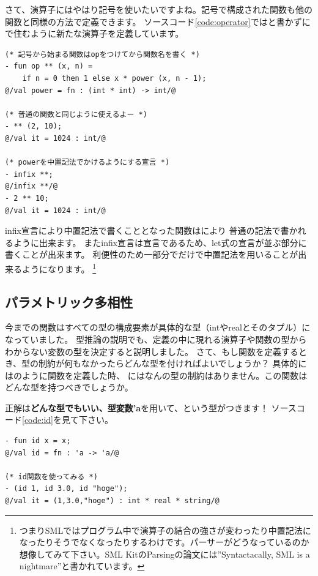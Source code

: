 \documentclass[11pt,a4paper]{article}
\begin{document}
さて、演算子にはやはり記号を使いたいですよね。記号で構成された関数も他の関数と同様の方法で定義できます。
ソースコード\ref{code:operator}ではと書かずに
\prog{**}で住むように新たな演算子を定義しています。

\begin{lstlisting}[caption=演算子の定義,label=code:operator]
(* 記号から始まる関数はopをつけてから関数名を書く *)
- fun op ** (x, n) =
    if n = 0 then 1 else x * power (x, n - 1);
@/val power = fn : (int * int) -> int/@

(* 普通の関数と同じように使えるよー *)
- ** (2, 10);
@/val it = 1024 : int/@

(* powerを中置記法でかけるようにする宣言 *)
- infix **;
@/infix **/@
- 2 ** 10;
@/val it = 1024 : int/@
\end{lstlisting}

infix宣言により中置記法で書くこととなった関数はにより
普通の記法で書かれるように出来ます。
またinfix宣言は宣言であるため、let式の宣言が並ぶ部分に書くことが出来ます。
利便性のため一部分でだけで中置記法を用いることが出来るようになります。
\footnote{つまりSMLではプログラム中で演算子の結合の強さが変わったり中置記法になったりそうでなくなったりするわけです。パーサーがどうなっているのか想像してみて下さい。SML KitのParsingの論文には''Syntactacally, SML is a nightmare''\cite{SML-KIT}と書かれています。}

\subsection{パラメトリック多相性}

今までの関数はすべての型の構成要素が具体的な型（intやrealとそのタプル）になっていました。
型推論の説明でも、定義の中に現れる演算子や関数の型からわからない変数の型を決定すると説明しました。
さて、もし関数を定義するとき、型の制約が何もなかったらどんな型を付ければよいでしょうか？
具体的にはのように関数を定義した時、
にはなんの型の制約はありません。この関数はどんな型を持つべきでしょうか。

正解は{\bfseries どんな型でもいい、型変数'a}を用いて、という型がつきます！
ソースコード\ref{code:id}を見て下さい。

\begin{lstlisting}[caption=多相関数,label=code:id]
- fun id x = x;
@/val id = fn : 'a -> 'a/@

(* id関数を使ってみる *)
- (id 1, id 3.0, id "hoge");
@/val it = (1,3.0,"hoge") : int * real * string/@
\end{lstlisting}
\end{document}
